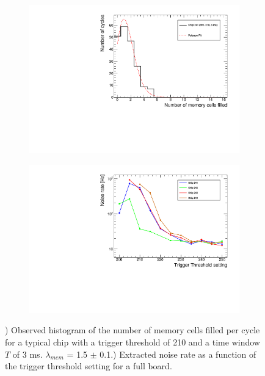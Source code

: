 \begin{figure}[htbp!]
  \centering
  \begin{subfigure}[t]{0.49\textwidth}
    \includegraphics[width=1.\linewidth]{../Thesis_Plots/Commissioning/Plots/NumberMemFilled_Poisson.pdf}
    \caption{} \label{fig:MemPoison}
  \end{subfigure}
  \hfill
  \begin{subfigure}[t]{0.49\textwidth}
    \includegraphics[width=1.\linewidth]{../Thesis_Plots/Commissioning/Plots/NoiseMeasurement_SM1.pdf}
    \caption{} \label{fig:DCRThr}
  \end{subfigure}
  \caption{) Observed histogram of the number of memory cells filled per cycle for a typical chip with a trigger threshold of 210 and a time window $T$ of 3 ms. $\lambda_{mem}$ = 1.5 $\pm$ 0.1.) Extracted noise rate as a function of the trigger threshold setting for a full board.}
\end{figure}

